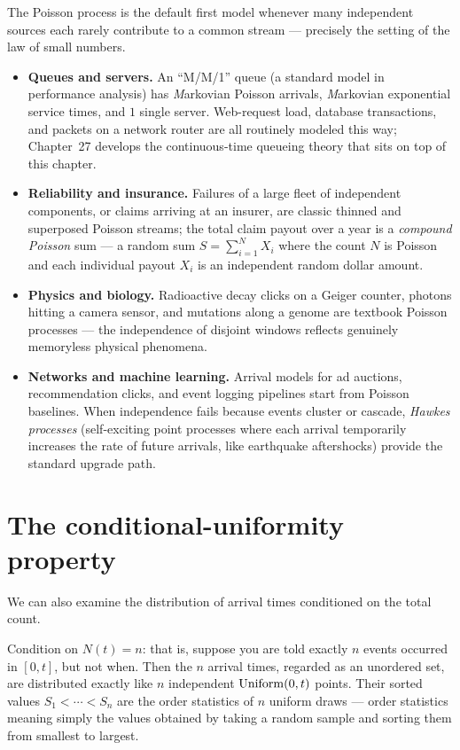 \begin{applicationbox}
The Poisson process is the default first model whenever many independent sources
each rarely contribute to a common stream --- precisely the setting of the law of
small numbers.
\begin{itemize}
\item \textbf{Queues and servers.} An ``M/M/1'' queue (a standard model in
performance analysis) has \emph{M}arkovian Poisson arrivals, \emph{M}arkovian
exponential service times, and $1$ single server. Web-request load, database transactions,
and packets on a network router are all routinely modeled this way; Chapter~27 develops
the continuous-time queueing theory that sits on top of this chapter.
\item \textbf{Reliability and insurance.} Failures of a large fleet of
independent components, or claims arriving at an insurer, are classic thinned and
superposed Poisson streams; the total claim payout over a year is a
\emph{compound Poisson} sum --- a random sum $S = \sum_{i=1}^N X_i$ where the count
$N$ is Poisson and each individual payout $X_i$ is an independent random dollar amount.
\item \textbf{Physics and biology.} Radioactive decay clicks on a Geiger counter,
photons hitting a camera sensor, and mutations along a genome are textbook Poisson
processes --- the independence of disjoint windows reflects genuinely
memoryless physical phenomena.
\item \textbf{Networks and machine learning.} Arrival models for ad auctions,
recommendation clicks, and event logging pipelines start from Poisson baselines.
When independence fails because events cluster or cascade, \emph{Hawkes processes}
(self-exciting point processes where each arrival temporarily increases the rate of
future arrivals, like earthquake aftershocks) provide the standard upgrade path.
\end{itemize}
\end{applicationbox}




\section{The conditional-uniformity property}
\label{ch25:uniformity}

We can also examine the distribution of arrival times conditioned on the total count.

\begin{theorem}
\label{ch25:thm-uniformity}
Condition on $N(t)=n$: that is, suppose you are told exactly $n$ events occurred
in $[0,t]$, but not when. Then the $n$ arrival times, regarded as an unordered
set, are distributed exactly like $n$ independent $\operatorname{Uniform}(0,t)$ points. Their
sorted values $S_1 < \cdots < S_n$ are the order statistics of $n$ uniform draws
--- order statistics meaning simply the values obtained by taking a random sample
and sorting them from smallest to largest.
\end{theorem}

